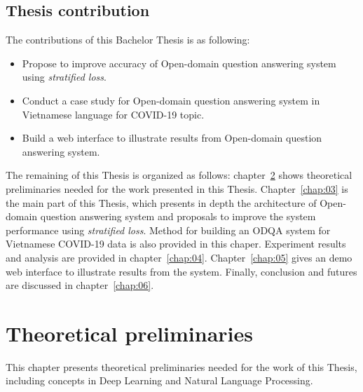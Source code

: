 \documentclass[12pt, sort&compress]{report}
\begin{document}
\section{Thesis contribution}
The contributions of this Bachelor Thesis is as following:
\begin{itemize}
	\item Propose to improve accuracy of Open-domain question answering system using \textit{stratified loss}.
	\item Conduct a case study for Open-domain question answering system in Vietnamese language for COVID-19 topic.
	\item Build a web interface to illustrate results from Open-domain question answering system.
\end{itemize}
\par The remaining of this Thesis is organized as follows: chapter~\ref{chap:02} shows theoretical preliminaries needed for the work presented in this Thesis. Chapter~\ref{chap:03} is the main part of this Thesis, which presents in depth the architecture of Open-domain question answering system and proposals to improve the system performance using \textit{stratified loss}. Method for building an ODQA system for Vietnamese COVID-19 data is also provided in this chaper. Experiment results and analysis are provided in chapter~\ref{chap:04}. Chapter~\ref{chap:05} gives an demo web interface to illustrate results from the system. Finally, conclusion and futures are discussed in chapter~\ref{chap:06}.
\chapter{Theoretical preliminaries}
\label{chap:02}
This chapter presents theoretical preliminaries needed for the work of this Thesis, including concepts in Deep Learning and Natural Language Processing.
\end{document}

